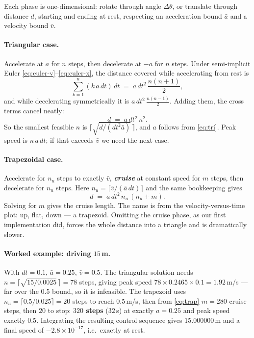 \documentclass[11pt,a4paper]{article}
\newcommand{\defn}[1]{\textbf{\textit{#1}}}
\begin{document}
Each phase is one-dimensional: rotate through angle $\Delta\theta$, or translate through
distance $d$, starting and ending at rest, respecting an acceleration bound $\bar{a}$ and a
velocity bound $\bar{v}$.

\paragraph{Triangular case.} Accelerate at $a$ for $n$ steps, then decelerate at $-a$ for
$n$ steps. Under semi-implicit Euler \eqref{eq:euler-v}--\eqref{eq:euler-x}, the distance
covered while accelerating from rest is
\[
\sum_{k=1}^{n} (k\,a\,dt)\,dt \;=\; a\,dt^2\,\frac{n(n+1)}{2},
\]
and while decelerating symmetrically it is $a\,dt^2\,\frac{n(n-1)}{2}$. Adding them, the
cross terms cancel neatly:
\begin{equation}
d \;=\; a\,dt^2\,n^2 .
\label{eq:tri}
\end{equation}
So the smallest feasible $n$ is $\lceil \sqrt{d/(dt^2\bar{a})}\,\rceil$, and $a$ follows from
\eqref{eq:tri}. Peak speed is $n\,a\,dt$; if that exceeds $\bar{v}$ we need the next case.

\paragraph{Trapezoidal case.} Accelerate for $n_u$ steps to exactly $\bar{v}$, \defn{cruise}
at constant speed for $m$ steps, then decelerate for $n_u$ steps. Here
$n_u = \lceil \bar{v}/(\bar{a}\,dt) \rceil$ and the same bookkeeping gives
\begin{equation}
d \;=\; a\,dt^2\,n_u\,(n_u + m).
\label{eq:trap}
\end{equation}
Solving for $m$ gives the cruise length. The name is from the velocity-versus-time plot:
up, flat, down --- a trapezoid. Omitting the cruise phase, as our first implementation did,
forces the whole distance into a triangle and is dramatically slower.

\paragraph{Worked example: driving $15$\,m.} With $dt = 0.1$, $\bar{a} = 0.25$,
$\bar{v} = 0.5$. The triangular solution needs $n = \lceil\sqrt{15/0.0025}\,\rceil = 78$
steps, giving peak speed $78 \times 0.2465 \times 0.1 = 1.92$\,m/s --- far over the
$0.5$ bound, so it is infeasible. The trapezoid uses
$n_u = \lceil 0.5/0.025 \rceil = 20$ steps to reach $0.5$\,m/s, then from \eqref{eq:trap}
$m = 280$ cruise steps, then $20$ to stop: \textbf{$320$ steps} ($32$\,s) at exactly
$a = 0.25$ and peak speed exactly $0.5$. Integrating the resulting control sequence gives
$15.000000$\,m and a final speed of $-2.8\times10^{-17}$, i.e.\ exactly at rest.
\end{document}

